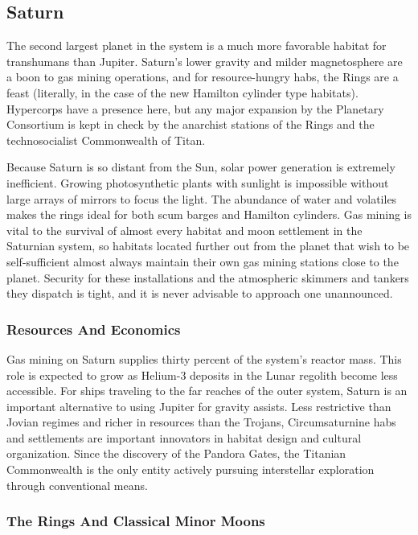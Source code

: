 \subsection{Saturn}

The second largest planet in the system is a much 
more favorable habitat for transhumans than Jupiter. 
Saturn's lower gravity and milder magnetosphere are 
a boon to gas mining operations, and for resource-hungry
habs, the Rings are a feast (literally, in the case
of the new Hamilton cylinder type habitats). Hypercorps
have a presence here, but any major expansion
by the Planetary Consortium is kept in check by the 
anarchist stations of the Rings and the technosocialist 
Commonwealth of Titan.

Because Saturn is so distant from the Sun, solar 
power generation is extremely inefficient. Growing 
photosynthetic plants with sunlight is impossible 
without large arrays of mirrors to focus the light. The 
abundance of water and volatiles makes the rings 
ideal for both scum barges and Hamilton cylinders. 
Gas mining is vital to the survival of almost every 
habitat and moon settlement in the Saturnian system, 
so habitats located further out from the planet that 
wish to be self-sufficient almost always maintain their 
own gas mining stations close to the planet. Security 
for these installations and the atmospheric skimmers 
and tankers they dispatch is tight, and it is never advisable
to approach one unannounced.

\subsubsection{Resources And Economics}

Gas mining on Saturn supplies thirty percent of the 
system's reactor mass. This role is expected to grow 
as Helium-3 deposits in the Lunar regolith become 
less accessible. For ships traveling to the far reaches 
of the outer system, Saturn is an important alternative
to using Jupiter for gravity assists. Less restrictive
than Jovian regimes and richer in resources than
the Trojans, Circumsaturnine habs and settlements 
are important innovators in habitat design and cultural
organization. Since the discovery of the Pandora
Gates, the Titanian Commonwealth is the only entity 
actively pursuing interstellar exploration through 
conventional means.

\subsubsection{The Rings And Classical Minor Moons}

